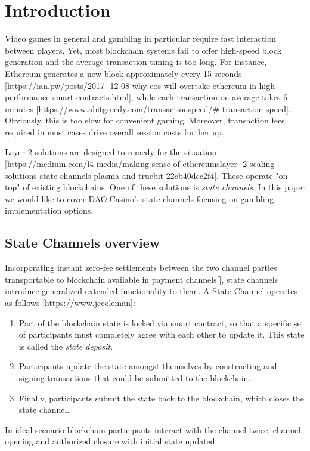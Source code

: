 \section{Introduction}
	Video games in general and gambling in particular require fast interaction between players. Yet, most blockchain systems fail to offer high-speed block generation and the average transaction timing is too long. For instance, Ethereum generates a new block approximately every 15 seconds [https://ian.pw/posts/2017-
12-08-why-eos-will-overtake-ethereum-in-high-performance-smart-contracts.html], while each transaction on average takes 6 minutes [https://www.abitgreedy.com/transactionspeed/#
transaction-speed]. Obviously, this is too slow for convenient gaming. Moreover, transaction fees required in most cases drive overall session costs further up.


	Layer 2 solutions are designed to remedy for the situation [https://medium.com/l4-media/making-sense-of-ethereumslayer-
2-scaling-solutions-state-channels-plasma-and-truebit-22cb40dcc2f4]. These operate "on top" of existing blockchains. One of these solutions is \textit{state channels}. In this paper we would like to cover DAO.Casino's state channels focusing on gambling implementation options.


		\subsection {State Channels overview}
	Incorporating instant zero-fee settlements between the two channel parties transportable to blockchain available in payment channels[], state channels introduce generalized extended functionality to them. 
	A State Channel operates as follows [https://www.jecoleman]:
	\begin{enumerate}
		\item Part of the blockchain state is locked via smart contract, so that a specific set of participants must completely agree with each other to update it. This state is called the \textit {state deposit}.
		\item Participants update the state amongst themselves by constructing and signing transactions that could be submitted to the blockchain.
		\item Finally, participants submit the state back to the blockchain, which closes the state channel.
	\end{enumerate}

	In ideal scenario blockchain participants interact with the channel twice: channel opening and authorized closure with initial state updated.

